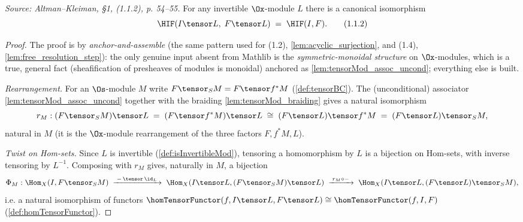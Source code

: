 \begin{lemma}
  \label{lem:H_tensor_invertible}
  \textit{Source: Altman--Kleiman, §1, (1.1.2), p. 54--55.}
  For any invertible $\Ox$-module $L$ there is a canonical isomorphism
  \[
    \HIF(I \tensor L,\; F \tensor L) \;=\; \HIF(I,F).
    \tag{1.1.2}
  \]
  \begin{proof}
    The proof is by \emph{anchor-and-assemble} (the same pattern used for (1.2),
    \cref{lem:acyclic_surjection}, and (1.4), \cref{lem:free_resolution_step}): the
    only genuine input absent from Mathlib is the \emph{symmetric-monoidal structure}
    on $\Ox$-modules, which is a true, general fact (sheafification of presheaves of
    modules is monoidal) anchored as \cref{lem:tensorMod_assoc_uncond}; everything
    else is built.

    \emph{Rearrangement.} For an $\Os$-module $M$ write $F \tensor_S M = F \tensor f^*M$
    (\cref{def:tensorBC}). The (unconditional) associator \cref{lem:tensorMod_assoc_uncond}
    together with the braiding \cref{lem:tensorMod_braiding} gives a natural isomorphism
    \[
      r_M : (F \tensor_S M) \tensor L \;=\; (F \tensor f^*M) \tensor L
            \;\cong\; (F \tensor L) \tensor f^*M
            \;=\; (F \tensor L) \tensor_S M,
    \]
    natural in $M$ (it is the $\Ox$-module rearrangement of the three factors
    $F, f^*M, L$).

    \emph{Twist on Hom-sets.} Since $L$ is invertible (\cref{def:isInvertibleMod}),
    tensoring a homomorphism by $L$ is a bijection on Hom-sets, with inverse tensoring
    by $L^{-1}$. Composing with $r_M$ gives, naturally in $M$, a bijection
    \[
      \Phi_M : \Hom_X(I, F \tensor_S M)
        \;\xrightarrow{\;-\,\tensor\,\id_L\;}\;
        \Hom_X(I \tensor L, (F \tensor_S M) \tensor L)
        \;\xrightarrow{\; r_M \circ -\;}\;
        \Hom_X(I \tensor L, (F \tensor L) \tensor_S M),
    \]
    i.e. a natural isomorphism of functors
    $\homTensorFunctor(f, I\tensor L, F\tensor L) \cong \homTensorFunctor(f, I, F)$
    (\cref{def:homTensorFunctor}).


\end{proof}
\end{lemma}
